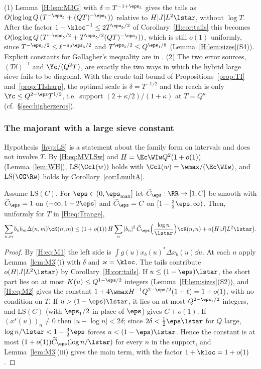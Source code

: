 \begin{remark}\label{H:rem:tails}
(1) Lemma~\ref{H:lem:M3G} with $\delta=T^{-1+\eps_5}$ gives the tails as $O(\log\log Q\,(T^{-\eps_5}+(QT)^{-\eps_1}))$ relative to $H|J|L^2\lstar$, without $\log T$. After the factor $1+\kloc^{-1}\le2T^{\eps_5/2}$ of Corollary~\ref{H:cor:tails} this becomes $O(\log\log Q\,(T^{-\eps_5/2}+T^{\eps_5/2}(QT)^{-\eps_1}))$, which is still $o(1)$ uniformly, since $T^{-\eps_5/2}\le\ell^{-a_0\eps_5/2}$ and $T^{\eps_5/2}\le Q^{\eps_1/8}$ (Lemma~\ref{H:lem:sizes}(S4)). Explicit constants for Gallagher's inequality are in \cite[\S6]{Ram16}. (2) The two error sources, $(T\delta)^{-1}$ and $\Yc/(Q^2T)$, are exactly the two ways in which the hybrid large sieve fails to be diagonal. With the crude tail bound of Propositions~\ref{prop:TI} and~\ref{prop:TIsharp}, the optimal scale is $\delta=T^{-1/2}$ and the reach is only $\Yc\le Q^{2-\eps}T^{1/2}$, i.e.\ support $(2+\kappa/2)/(1+\kappa)$ at $T=Q^\kappa$ (cf.\ \S\ref{sec:higherzeros}).
\end{remark}

\subsubsection*{The majorant with a large sieve constant}
Hypothesis~\ref{hyp:LS} is a statement about the family form on intervals and does not involve $T$. By \eqref{H:eq:MVLSw} and $H=\Ec\WIw Q^2(1+o(1))$ (Lemma~\ref{lem:WH}), $\mathrm{LS}(\Ccl(w))$ holds with $\Ccl(w)=\wmax/(\Ec\WIw)$, and $\mathrm{LS}(\CG\Rw)$ holds by Corollary~\ref{cor:LmultA}.

\begin{proposition}\label{H:prop:TI}
Assume $\mathrm{LS}(C)$. For $\eps\in(0,\eps_{\max}]$ let $\widetilde C_\eps:\RR\to[1,C]$ be smooth with $\widetilde C_\eps=1$ on $(-\infty,1-2\eps]$ and $\widetilde C_\eps=C$ on $[1-\frac32\eps,\infty)$. Then, uniformly for $T$ in \eqref{H:eq:Trange},
\[
\sum_{n,m}b_nb_m\Delta(n,m)\cK(n,m)\le(1+o(1))\,H\sum_n|b_n|^2\,\widetilde C_\eps\Big(\frac{\log n}{\lstar}\Big)\cK(n,n)+o\big(H|J|L^2\lstar\big).
\]
\end{proposition}
\begin{proof}
By \eqref{H:eq:M1} the left side is $\int g(u)x_b(u)^*\Delta x_b(u)\dd u$. At each $u$ apply Lemma~\ref{lem:M3}(i) with $\delta$ and $\varkappa=\kloc$. The tails contribute $o(H|J|L^2\lstar)$ by Corollary~\ref{H:cor:tails}. If $u\le(1-\eps)\lstar$, the short part lies on at most $K(u)\le Q^{1-\eps/2}$ integers (Lemma~\ref{H:lem:sizes}(S2)), and \eqref{H:eq:M2} gives the constant $1+4\wmax H^{-1}Q^{2-\eps/2}(1+\ell)=1+o(1)$, with no condition on $T$. If $u>(1-\eps)\lstar$, it lies on at most $Q^{2-\eps_1/2}$ integers, and $\mathrm{LS}(C)$ (with $\eps_1/2$ in place of $\eps$) gives $C+o(1)$. If $(x^s(u))_n\ne0$ then $|u-\log n|<2\delta$; since $2\delta<\frac12\eps\lstar$ for $Q$ large, $\log n/\lstar<1-\frac32\eps$ forces $u<(1-\eps)\lstar$. Hence the constant is at most $(1+o(1))\widetilde C_\eps(\log n/\lstar)$ for every $n$ in the support, and Lemma~\ref{lem:M3}(iii) gives the main term, with the factor $1+\kloc=1+o(1)$.
\end{proof}

